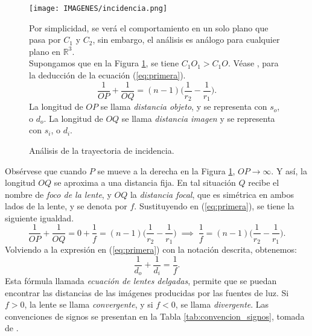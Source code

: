 \documentclass[10pt,a4paper]{article}
\begin{document}
\begin{figure}[ht]
	\begin{minipage}{0.5\linewidth}
		\texttt{[image: IMAGENES/incidencia.png]}
		\caption{Análisis de la trayectoria de incidencia.}
		\label{fig:incidencia}
	\end{minipage}\hspace{5mm}
	\begin{minipage}{0.5\linewidth}
		Por simplicidad, se verá el comportamiento en un solo plano que pasa por \(C_1\) y \(C_2\), sin embargo, el análisis es análogo para cualquier plano en \(\mathbb{R} ^3\). \\[2mm]
		Supongamos que en la Figura \ref{fig:incidencia}, se tiene \(C_1O_1 > C_1O\). Véase , para la deducción de la ecuación (\ref{eq:primera}).
		\begin{equation}
			\dfrac{1}{OP} + \dfrac{1}{OQ} = (n-1) \bigg(\dfrac{1}{r_2} - \dfrac{1}{r_1}\bigg).
			\label{eq:primera}
		\end{equation}
		La longitud de \(OP\) se llama \textit{distancia objeto}, y se representa con \(s_o\), o \(d_o\). La longitud de \(OQ\) se llama \textit{distancia imagen} y se representa con \(s_i\), o \(d_i\). \\[2mm]
	\end{minipage}
\end{figure}
Obsérvese que cuando \(P\) se mueve a la derecha en la Figura \ref{fig:incidencia}, \(OP \longrightarrow \infty\). Y así, la longitud \(OQ\) se aproxima a una distancia fija. En tal situación \(Q\) recibe el nombre de \textit{foco de la lente}, y \(OQ\) la \textit{distancia focal}, que es simétrica en ambos lados de la lente, y se denota por \(f\). Sustituyendo en (\ref{eq:primera}), se tiene la siguiente igualdad.
\[
	\dfrac{1}{OP} + \dfrac{1}{OQ} = 0+ \dfrac{1}{f} = (n-1) \bigg(\dfrac{1}{r_2} - \dfrac{1}{r_1}\bigg) \;\implies\; \dfrac{1}{f} = (n-1) \bigg(\dfrac{1}{r_2} - \dfrac{1}{r_1}\bigg).
\]
Volviendo a la expresión en (\ref{eq:primera}) con la notación descrita, obtenemos:
\begin{equation}
	\dfrac{1}{d_o} + \dfrac{1}{d_i} = \dfrac{1}{f}.
	\label{eq:ley_distancias}
\end{equation}
\newpage
Esta fórmula llamada \textit{ecuación de lentes delgadas}, permite que se puedan encontrar las distancias de las imágenes producidas por las fuentes de luz. Si \(f>0\), la lente se llama \textit{convergente}, y si \(f<0\), se llama \textit{divergente}. Las convenciones de signos se presentan en la Tabla \ref{tab:convencion_signos}, tomada de .
\end{document}
